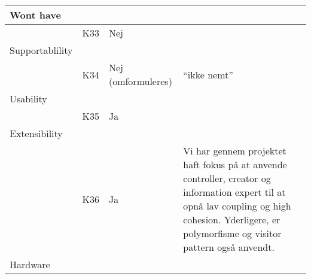 \documentclass[class=article, crop=false]{standalone}
\begin{document}
\begin{table}[]
\begin{tabular}{|l|l|l|l|}
            Wont have       &                &                    &                                                                                                                                                                                                    \\ \hline
            & K33            & Nej                &                                                                                                                                                                                                    \\ \hline
            Supportablility &                &                    &                                                                                                                                                                                                    \\ \hline
            & K34            & Nej (omformuleres) & “ikke nemt”                                                                                                                                                                                        \\ \hline
            Usability       &                &                    &                                                                                                                                                                                                    \\ \hline
            & K35            & Ja                 &                                                                                                                                                                                                    \\ \hline
            Extensibility   &                &                    &                                                                                                                                                                                                    \\ \hline
            & K36            & Ja                 & Vi har gennem projektet haft fokus på at anvende controller, creator og information expert til at opnå lav coupling og high cohesion. Yderligere, er polymorfisme og visitor pattern også anvendt. \\ \hline
            Hardware        &                &                    &                                                                                                                                                                                                    \\ \hline

\end{tabular}
\end{table}
\end{document}
